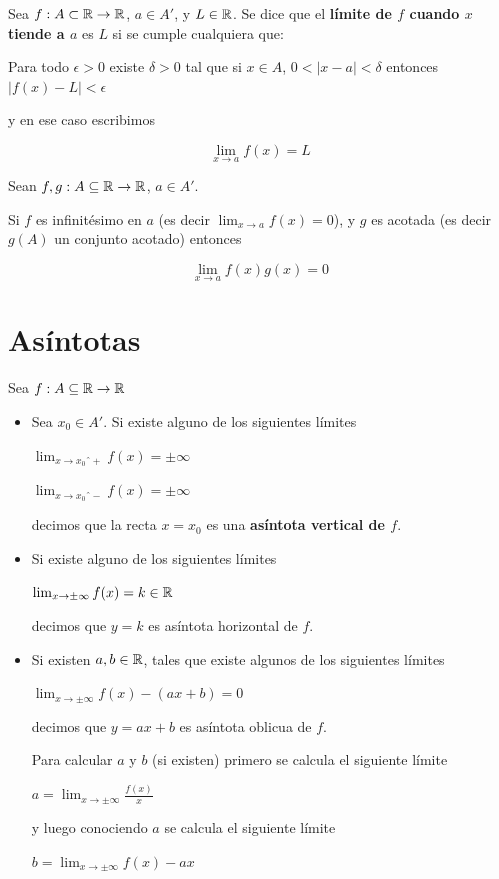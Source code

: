 \begin{definition}[Límite] \label{limite_r}
Sea $f : A \subset \mathbb{R} \to \mathbb{R}$, $ a \in A'$, y $L \in \mathbb{R}$.  Se dice que el \textbf{límite de $f$ cuando $x$ tiende a $a$}  es $L$ si se cumple cualquiera que:

Para todo $\epsilon > 0$ existe $\delta > 0$ tal que si $x \in A$, $0 < |x-a| < \delta$ entonces $|f(x) - L| < \epsilon$

y en ese caso escribimos

$$ \displaystyle \lim_{x \to a} f(x) = L $$
\end{definition}


\begin{theorem} \label{cero_por_acotada}
Sean $f,g:A \subseteq \mathbb{R} \to \mathbb{R}$, $a \in A'$.

Si $f$ es infinitésimo en $a$ (es decir $ \lim_{x \to a} f(x) = 0$), y $g$ es acotada (es decir $g(A)$ un conjunto acotado) entonces

$$ \lim_{x \to a} f(x)g(x) = 0 $$
\end{theorem}


\section{Asíntotas}


\begin{definition}[Asíntotas]
Sea $f: A \subseteq \mathbb{R} \to \mathbb{R}$

\begin{itemize}
\item Sea $x_0 \in A'$.  Si existe alguno de los siguientes límites 

$\lim_{x \to x_0ˆ+} f(x) = \pm \infty$

$\lim_{x \to x_0ˆ-} f(x) = \pm \infty$

decimos que la recta $x = x_0$ es una \textbf{asíntota vertical de $f$}.


\item Si existe alguno de los siguientes límites 

$\lim_{x \to \pm \infty} f(x) = k \in \mathbb{R}$ 

decimos que $y = k$ es asíntota horizontal de $f$.


\item Si existen $a,b \in \mathbb{R}$, tales que existe algunos de los siguientes límites

$\lim_{x \to \pm \infty} f(x) - (ax+b) = 0$ 

decimos que $y = ax+b$ es asíntota oblicua de $f$.

Para calcular $a$ y $b$ (si existen) primero se calcula el siguiente límite

$ a = \lim_{x \to \pm \infty} \frac{f(x)}{x} $

y luego conociendo $a$ se calcula el siguiente límite

$ b = \lim_{x \to \pm \infty} f(x) - ax $
\end{itemize}
\end{definition}


